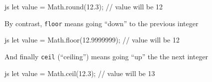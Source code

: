 \documentclass[10pt,a4paper]{article}
\begin{document}
\begin{multicols}{3}
\begin{codebox}{js}{}
  let value = Math.round(12.3); // value will be 12
\end{codebox}
By contrast, \texttt{floor} means going \enquote{down} to the previous integer
\begin{codebox}{js}{}
  let value = Math.floor(12.9999999); // value will be 12
\end{codebox}
And finally \texttt{ceil} (\enquote{ceiling}) means going \enquote{up} the the next integer
\begin{codebox}{js}{}
  let value = Math.ceil(12.3); // value will be 13
\end{codebox}




\printbibliography
{}
\end{multicols}
\end{document}
